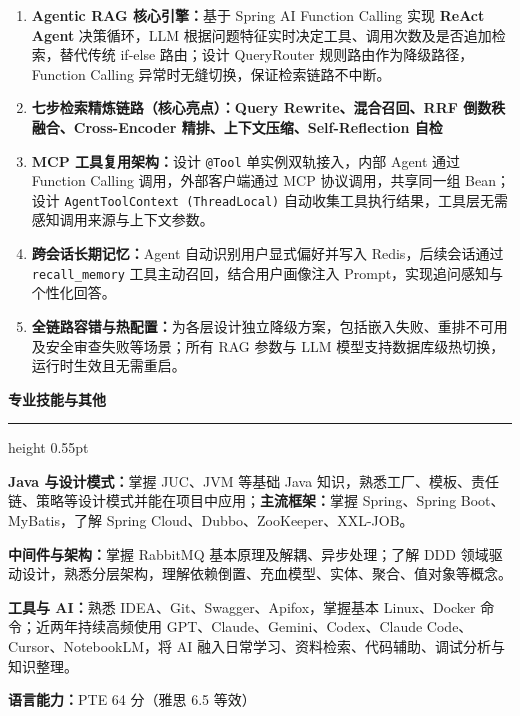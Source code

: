 \documentclass[UTF8,a4paper,9pt]{ctexart}
\newcommand{\sectiontitle}[1]{%
  \vspace{1.5pt}%
  {\color{navy}\bfseries\fontsize{10.5pt}{11.5pt}\selectfont #1}\par
  \vspace{0.5pt}\color{navy}\hrule height 0.55pt\color{black}\vspace{1pt}%
}
\begin{document}
\begin{enumerate}[leftmargin=1.45em,label=\arabic*.,nosep,topsep=0pt,itemsep=0.25pt,parsep=0pt]
  \item \textbf{Agentic RAG 核心引擎：}基于 Spring AI Function Calling 实现 \textbf{ReAct Agent} 决策循环，LLM 根据问题特征实时决定工具、调用次数及是否追加检索，替代传统 if-else 路由；设计 QueryRouter 规则路由作为降级路径，Function Calling 异常时无缝切换，保证检索链路不中断。
  \item \textbf{七步检索精炼链路（核心亮点）：Query Rewrite、混合召回、RRF 倒数秩融合、Cross-Encoder 精排、上下文压缩、Self-Reflection 自检}
  \item \textbf{MCP 工具复用架构：}设计 \texttt{@Tool} 单实例双轨接入，内部 Agent 通过 Function Calling 调用，外部客户端通过 MCP 协议调用，共享同一组 Bean；设计 \texttt{AgentToolContext (ThreadLocal)} 自动收集工具执行结果，工具层无需感知调用来源与上下文参数。
  \item \textbf{跨会话长期记忆：}Agent 自动识别用户显式偏好并写入 Redis，后续会话通过 \texttt{recall\_memory} 工具主动召回，结合用户画像注入 Prompt，实现追问感知与个性化回答。
  \item \textbf{全链路容错与热配置：}为各层设计独立降级方案，包括嵌入失败、重排不可用及安全审查失败等场景；所有 RAG 参数与 LLM 模型支持数据库级热切换，运行时生效且无需重启。
\end{enumerate}

\sectiontitle{专业技能与其他}
{\fontsize{8.3pt}{9.2pt}\selectfont
\textbf{Java 与设计模式：}掌握 JUC、JVM 等基础 Java 知识，熟悉工厂、模板、责任链、策略等设计模式并能在项目中应用；\textbf{主流框架：}掌握 Spring、Spring Boot、MyBatis，了解 Spring Cloud、Dubbo、ZooKeeper、XXL-JOB。\par
\textbf{中间件与架构：}掌握 RabbitMQ 基本原理及解耦、异步处理；了解 DDD 领域驱动设计，熟悉分层架构，理解依赖倒置、充血模型、实体、聚合、值对象等概念。\par
\textbf{工具与 AI：}熟悉 IDEA、Git、Swagger、Apifox，掌握基本 Linux、Docker 命令；近两年持续高频使用 GPT、Claude、Gemini、Codex、Claude Code、Cursor、NotebookLM，将 AI 融入日常学习、资料检索、代码辅助、调试分析与知识整理。\par
\textbf{语言能力：}PTE 64 分（雅思 6.5 等效）
}
\end{document}
